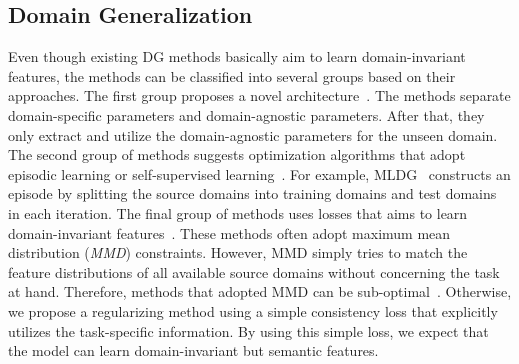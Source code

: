 \subsection{Domain Generalization}
Even though existing DG methods basically aim to learn domain-invariant features, the methods can be classified into several groups based on their approaches. The first group proposes a novel architecture~\cite{Khosla12undobias, Li2017dg}. The methods separate domain-specific parameters and domain-agnostic parameters. After that, they only extract and utilize the domain-agnostic parameters for the unseen domain. The second group of methods suggests optimization algorithms that adopt episodic learning or self-supervised learning~\cite{li2019episodic, Li2018MLDG, NIPS2018_metareg}. For example, MLDG~\cite{Li2018MLDG} constructs an episode by splitting the source domains into training domains and test domains in each iteration. The final group of methods uses losses that aims to learn domain-invariant features~\cite{Ghifary2015mtae, muandet2013domaingeneralization, mmdaaecvpr2018, carlucci2019domain}. These methods often adopt maximum mean distribution (\textit{MMD}) constraints. However, MMD simply tries to match the feature distributions of all available source domains without concerning the task at hand. Therefore, methods that adopted MMD can be sub-optimal~\cite{Saito2018, Saito2018b}. Otherwise, we propose a regularizing method using a simple consistency loss that explicitly utilizes the task-specific information. By using this simple loss, we expect that the model can learn domain-invariant but semantic features.